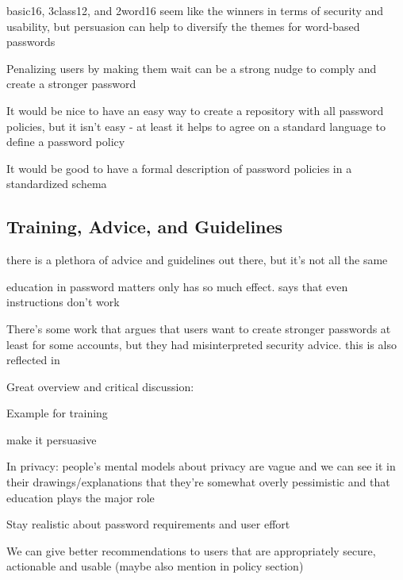 	basic16, 3class12, and 2word16 seem like the winners in terms of security and usability, but persuasion can help to diversify the themes for word-based passwords \cite{Shay2014CanLongPasswordsBeSecureAndUsable}
	
	
	Penalizing users by making them wait can be a strong nudge to comply and create a stronger password \cite{Malkin2013Waiting}
	
	It would be nice to have an easy way to create a repository with all password policies, but it isn't easy - at least it helps to agree on a standard language to define a password policy \cite{Steves2015PasswordPolicyLanguage}
	
	It would be good to have a formal description of password policies in a standardized schema \cite{Horsch2016PasswordPolicyMarkup}

	\subsection{Training, Advice, and Guidelines}\label{sec:rw:advice_guidance}
	
	there is a plethora of advice and guidelines out there, but it's not all the same 
	
	education in password matters only has so much effect. 
	\cite{Forget2007HelpingUsers} says that even instructions don't work
	
	There's some work that argues that users want to create stronger passwords at least for some accounts, but they had
	misinterpreted security advice. 
	this is also reflected in \cite{Ur2016PerceptionsPassword}
	
	Great overview and critical discussion: \cite{ZhangKennedy2016RevisitingPasswordRules}
	
	Example for training \cite{Bonneau2014ReliableStorage56Bits}
	
	make it persuasive \cite{Zakaria2013DesigningEffectiveSecurityMessages}
	
	In privacy: people's mental models about privacy are vague and we can see it in their drawings/explanations that they're somewhat overly pessimistic and that education plays the major role \cite{Kang2015MentalModelsDrawing}
	
	
	Stay realistic about password requirements and user effort \cite{Florencio2016CommACM}
	
	We can give better recommendations to users that are appropriately secure, actionable and usable \cite{ZhangKennedy2016RevisitingPasswordRules} (maybe also mention in policy section)
		
